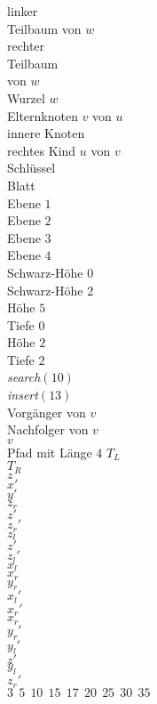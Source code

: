 \documentclass[a4paper,12pt]{article}
\begin{document}
\raggedright
\color{ForestGreen}
linker\\ Teilbaum von $w$\\
rechter\\ Teilbaum \\ von $w$\\
Wurzel $w$\\
Elternknoten $v$ von $u$\\
innere Knoten\\
rechtes Kind $u$ von $v$\\
Schlüssel\\
Blatt\\
Ebene $1$ \\
Ebene $2$ \\  
Ebene $3$ \\  
Ebene $4$ \\
Schwarz-Höhe 0\\
Schwarz-Höhe 2\\
Höhe $5$\\
Tiefe $0$\\
Höhe $2$\\
Tiefe $2$\\
\textit{search}$\left(10\right)$\\
\textit{insert}$\left(13\right)$\\
Vorgänger von $v$\\
Nachfolger von $v$\\
$v$\\
Pfad mit Länge $4$
\color{Black}
$T_L$\\
$T_R$\\
$z$\\
$x'$\\
$y'$\\
$z_r$\\
$z'$\\
${z_r}'$\\
$z_l$\\
$z'$\\
${z_l}'$\\
$x_l$\\
$x_r$\\
$y_r$\\
${x_l}'$\\
${x_r}'$\\
${x_r}$\\
${y_r}'$\\
${y_l}'$\\
$z'$\\
${y_l}$\\
${z_r}'$\\
$3~~5~~10~~15~~17~~20~~25~~30~~35$ \\
\end{document}
